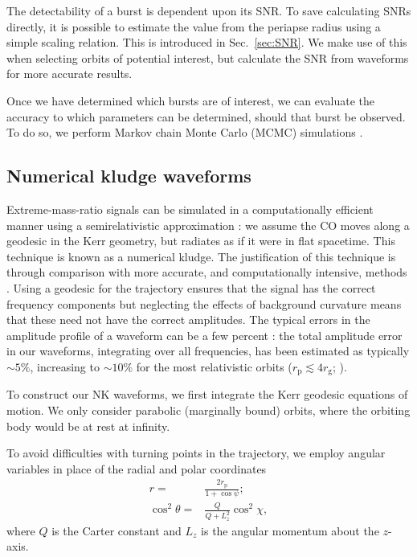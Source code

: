 \documentclass[useAMS,usedcolumn,usegraphicx,usenatbib]{mn2e}
\newcommand{\secref}[1]{Sec.~\ref{sec:#1}}
\newcommand{\sub}[1]{\ensuremath{_\mathrm{#1}}}
\begin{document}
The detectability of a burst is dependent upon its SNR. To save calculating SNRs directly, it is possible to estimate the value from the periapse radius using a simple scaling relation. This is introduced in \secref{SNR}. We make use of this when selecting orbits of potential interest, but calculate the SNR from waveforms for more accurate results.

Once we have determined which bursts are of interest, we can evaluate the accuracy to which parameters can be determined, should that burst be observed. To do so, we perform Markov chain Monte Carlo (MCMC) simulations \citep[chapter 29]{MacKay2003}.

\subsection{Numerical kludge waveforms}\label{sec:NK}

Extreme-mass-ratio signals can be simulated in a computationally efficient manner using a semirelativistic approximation \citep{Ruffini1981}: we assume the CO moves along a geodesic in the Kerr geometry, but radiates as if it were in flat spacetime. This technique is known as a numerical kludge. The justification of this technique is through comparison with more accurate, and computationally intensive, methods \citep{Gair2005, Babak2007}. Using a geodesic for the trajectory ensures that the signal has the correct frequency components but neglecting the effects of background curvature means that these need not have the correct amplitudes. The typical errors in the amplitude profile of a waveform  can be a few percent \citep{Tanaka1993,Gair2005}: the total amplitude error in our waveforms, integrating over all frequencies, has been estimated as typically $\sim 5\%$, increasing to $\sim 10\%$ for the most relativistic orbits ($r\sub{p} \lesssim 4 r\sub{g}$; \citealt{Berry2013}).

To construct our NK waveforms, we first integrate the Kerr geodesic equations of motion. We only consider parabolic (marginally bound) orbits, where the orbiting body would be at rest at infinity.

To avoid difficulties with turning points in the trajectory, we employ angular variables in place of the radial and polar coordinates \citep{Drasco2004}
\begin{align}
r = {} & \frac{2 r\sub{p}}{1 + \cos\psi};\\
\cos^2\theta = {} & \frac{Q}{Q+L_z^2}\cos^2\chi,
\end{align}
where $Q$ is the Carter constant and $L_z$ is the angular momentum about the $z$-axis.
\end{document}
